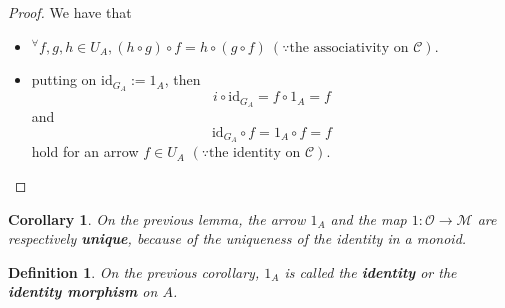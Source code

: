 \documentclass[dvipdfmx,10pt,notheorems]{beamer}
\newtheorem{definition}[theorem]{Definition}
\newtheorem{corollary}[theorem]{Corollary}
\renewcommand{\#}{^\sharp}
\newcommand{\id}{\mbox{id}}
\begin{document}
	
	\begin{frame}
			\begin{proof}
					We have that
					\begin{itemize}
						\item ${}^\forall f,g,h\in U_A, (h\circ g)\circ f = h\circ (g\circ f)~(\because
						\mbox{the associativity on }\mathcal{C})$.
						\item putting on $\id_{G_A}:=1_A$, then
								$$i \circ \id_{G_A} = f \circ 1_A = f $$
						and
								$$ \id_{G_A}\circ f = 1_A \circ f = f$$
						hold for an arrow $ f\in U_A$
						$(\because
						\mbox{the identity on }\mathcal{C})$.
					\end{itemize}
			\end{proof}
	\end{frame}
	
	
		
	\begin{frame}
			\begin{corollary}
					On the previous lemma, the arrow $1_A$ and
					the map $1:\mathcal{O}\rightarrow \mathcal{M}$ are respectively {\bf unique},
					because of the uniqueness of the identity in a monoid.
			\end{corollary}			
			\begin{definition}
					On the previous corollary, $1_A$ is called the {\bf identity} or the {\bf identity morphism} on $A$.
			\end{definition}
	\end{frame}
\end{document}
